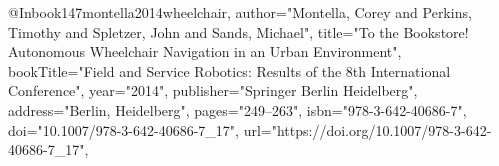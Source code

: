 @Inbook{147montella2014wheelchair,
author="Montella, Corey
and Perkins, Timothy
and Spletzer, John
and Sands, Michael",
title="To the Bookstore! Autonomous Wheelchair Navigation in an Urban Environment",
bookTitle="Field and Service Robotics: Results of the 8th International Conference",
year="2014",
publisher="Springer Berlin Heidelberg",
address="Berlin, Heidelberg",
pages="249--263",
isbn="978-3-642-40686-7",
doi="10.1007/978-3-642-40686-7_17",
url="https://doi.org/10.1007/978-3-642-40686-7_17",}